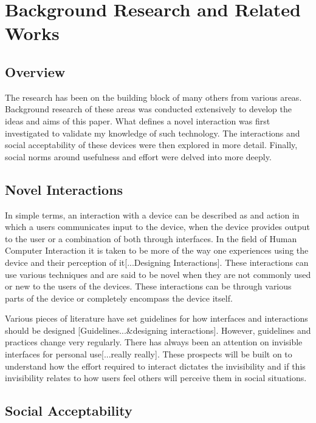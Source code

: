 \documentclass{l4proj}
\begin{document}
\chapter{Background Research and Related Works}
\section{Overview}
The research has been on the building block of many others from various areas. Background research of these areas was conducted extensively to develop the ideas and aims of this paper. What defines a novel interaction  was first investigated to validate my knowledge of such technology. The interactions and social acceptability of these devices were then explored in more detail. Finally, social norms around usefulness and effort were delved into more deeply.
\section{Novel Interactions}

In simple terms, an interaction with a device can be described as and action in which a users communicates input to the device, when the device provides output to the user or a combination of both through interfaces. In the field of Human Computer Interaction it is taken to be more of the way one experiences using the device and their perception of it[...Designing Interactions]. These interactions can use various techniques and are said to be novel when they are not commonly used or new to the users of the devices. These interactions can be through various parts of the device or completely encompass the device itself. 

Various pieces of literature have set guidelines for how interfaces and interactions should be designed [Guidelines...&designing interactions]. However, guidelines and practices change very regularly. There has always been an attention on invisible interfaces for personal use[...really really]. These prospects will be built on to understand how the effort required to interact dictates the invisibility and if this invisibility relates to how users feel others will perceive them in social situations.

\section{Social Acceptability}
\end{document}
